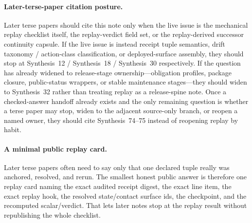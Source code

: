 \documentclass[11pt]{article}
\begin{document}
\paragraph{Later-terse-paper citation posture.}
Later terse papers should cite this note only when the live issue is the mechanical replay checklist itself, the replay-verdict field set, or the replay-derived successor continuity capsule. If the live issue is instead receipt tuple semantics, drift taxonomy / action-class classification, or deployed-surface assembly, they should stop at Synthesis~12 / Synthesis~18 / Synthesis~30 respectively. If the question has already widened to release-stage ownership---obligation profiles, package closure, public-status wrappers, or stable maintenance stages---they should widen to Synthesis~32 rather than treating replay as a release-spine note. Once a checked-answer handoff already exists and the only remaining question is whether a terse paper may stop, widen to the adjacent source-only branch, or reopen a named owner, they should cite Synthesis~74--75 instead of reopening replay by habit.\cite{series:receiptitems,series:planstateequiv,series:deployedsurfaces,series:releasespine,series:pairedterminalcitationdiscipline,series:pairedterminalcutoverrules}

\paragraph{A minimal public replay card.}
Later terse papers often need to say only that one declared tuple really was anchored, resolved, and rerun. The smallest honest public answer is therefore one replay card naming the exact audited receipt digest, the exact line item, the exact replay hook, the resolved state/contact surface ids, the checkpoint, and the recomputed scalar/verdict. That lets later notes stop at the replay result without republishing the whole checklist.
\end{document}
